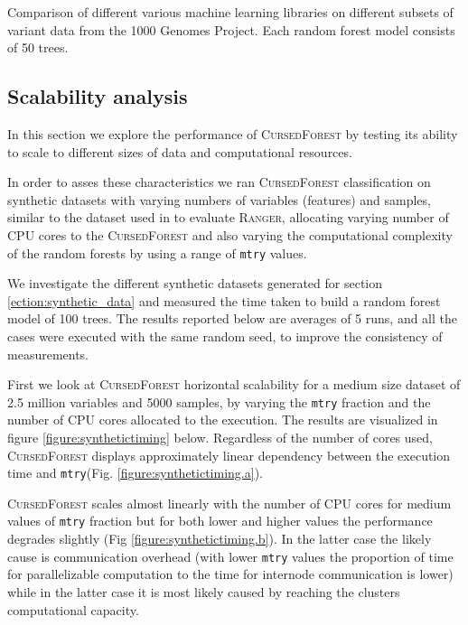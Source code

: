 \documentclass[10pt,letterpaper]{article}
\newcommand{\cursedforest}{\textsc{CursedForest}\xspace}
\newcommand{\ranger}{\textsc{Ranger}\xspace}
\newcommand{\mtry}{\texttt{mtry}\xspace}
\begin{document}
\begin{table}[!ht]
\begin{minipage}{\textwidth}
\begin{tabular}{| l | l | r | l |}
\end{tabular}
\begin{flushleft} 
Comparison of different various machine learning libraries on different subsets of variant data 
from the 1000 Genomes Project.
Each random forest model consists of 50 trees.
\end{flushleft}
\label{timingtable}
\end{minipage}
\end{table}

\subsection{Scalability analysis}
In this section we explore the performance of \cursedforest by testing its ability to scale to different sizes of data
and computational resources.

In order to asses these characteristics we ran \cursedforest classification on synthetic datasets with varying numbers
of variables (features) and samples, similar to the dataset used in \cite{Wright.and.Ziegle.2016} to evaluate
\ranger, allocating varying number of CPU cores to the \cursedforest and also varying the computational complexity
of the random forests by using a range of \mtry values.

We investigate the different synthetic datasets generated for section \ref{ection:synthetic_data} and measured the time
taken to build a random forest model of 100 trees. The results reported below are averages of 5 runs, and all the cases
were executed with the same random seed, to improve the consistency of measurements.

First we look at \cursedforest horizontal scalability for a medium size dataset of 2.5 million variables and 5000
samples, by varying the \mtry  fraction and the number of CPU cores allocated to the execution. 
The results are  visualized in figure \ref{figure:synthetictiming} below. 
Regardless of the number of cores used, \cursedforest displays approximately linear dependency between the execution
time and \mtry (Fig. \ref{figure:synthetictiming.a}).

\cursedforest scales almost linearly with the number of CPU cores for medium values of \mtry fraction but for both
lower and higher values the performance degrades slightly (Fig \ref{figure:synthetictiming.b}). In the latter case the likely cause is
communication overhead (with lower \mtry values the proportion of time for parallelizable computation to the time for
internode communication is lower) while in the latter case it is most likely caused by reaching the clusters
computational capacity.
\end{document}
